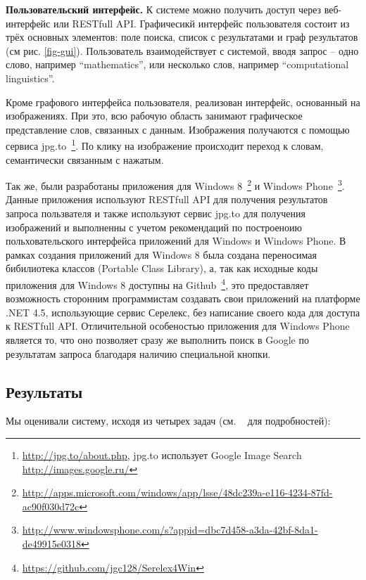 \documentclass[a4paper,10pt,twoside]{article}
\begin{document}
\textbf{Пользовательский интерфейс.} К системе можно получить доступ через веб-интерфейс или RESTfull API. Графичесикй интерфейс пользователя состоит из трёх основных элементов: поле поиска, список с результатами и граф результатов (см рис. \ref{fig-gui}). Пользователь взаимодействует с системой, вводя запрос -- одно слово, например ``mathematics'', или несколько слов, например ``computational linguistics''. 


Кроме графового интерфейса пользователя, реализован интерфейс, основанный на изображениях. При это, всю рабочую область занимают графическое представление слов, связанных с данным. Изображения получаются с помощью сервиса jpg.to~\footnote{\url{http://jpg.to/about.php}, jpg.to использует Google Image Search \url{http://images.google.ru/}}. По клику на изображение происходит переход к словам, семантически связанным с нажатым.


Так же, были разработаны приложения для Windows 8~\footnote{\url{http://apps.microsoft.com/windows/app/lsse/48dc239a-e116-4234-87fd-ac90f030d72c}} и Windows Phone~\footnote{\url{http://www.windowsphone.com/s?appid=dbc7d458-a3da-42bf-8da1-de49915e0318}}. Данные приложения используют RESTfull API для получения результатов запроса пользвателя и также используют сервис jpg.to для получения изображений и выполненны с учетом рекомендаций по построеноию польховательского интерфейса приложений для Windows и Windows Phone. В рамках создания приложений для Windows 8 была создана переносимая бибилиотека классов (Portable Class Library), а, так как исходные коды приложения для Windows 8 доступны на Github~\footnote{\url{https://github.com/jgc128/Serelex4Win}}, это предоставляет возможность сторонним программистам создавать свои приложений на платформе .NET 4.5, использующие сервис Серелекс, без написание своего кода для доступа к RESTfull API. Отличительной особеностью приложения для Windows Phone является то, что оно 
позволяет сразу же выполнить поиск в Google по результатам запроса благодаря наличию специальной кнопки.



\subsection{Результаты}
Мы оценивали систему, исходя из четырех задач (см. ~\cite{panchenko2012konvens} для подробностей):
\end{document}
